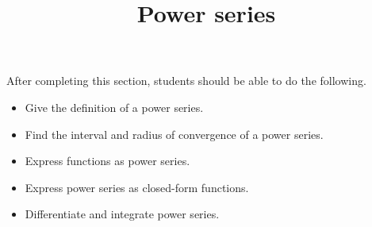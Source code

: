 \documentclass{ximera}
\title{Power series}
\begin{document}
\begin{abstract}
\end{abstract}

\maketitle

\begin{sectionOutcomes}

After completing this section, students should be able to do the following.

\begin{itemize}
\item Give the definition of a power series.
\item Find the interval and radius of convergence of a power series.
\item Express functions as power series.
\item Express power series as closed-form functions.
\item Differentiate and integrate power series. 
\end{itemize}

\end{sectionOutcomes}
\end{document}
